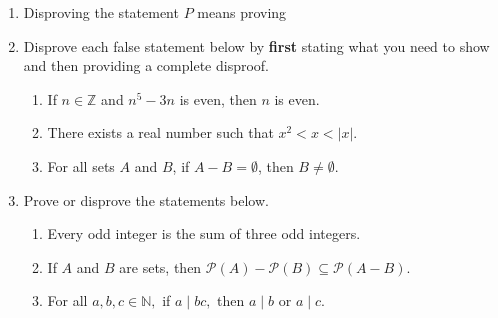 \documentclass[12pt]{article}
\newcommand{\N}{\mathbb{N}}
\newcommand{\Z}{\mathbb{Z}}
\begin{document}
\begin{enumerate}
\item Disproving the statement $P$ means proving \\

\item Disprove each false statement below by \textbf{first} stating what you need to show and then providing a complete disproof.
	\begin{enumerate}
	\item If $n \in \Z$ and $n^5-3n$ is even, then $n$ is even.
	\vfill
	\item There exists a real number such that $x^2 < x < |x|.$
	\vfill
	\item For all sets $A$ and $B$, if $A-B=\emptyset$, then $B \not = \emptyset.$
	\vfill
	\end{enumerate}
\newpage
\item Prove or disprove the statements below.
	\begin{enumerate}
	\item Every odd integer is the sum of three odd integers.
	\vfill
	\item If $A$ and $B$ are sets, then $\mathcal{P}(A) - \mathcal{P}(B)  \subseteq \mathcal{P}(A-B).$
	\vfill
	\item For all $a,b,c \in \N,$ if $a \mid bc,$ then $a \mid b$ or $a \mid c.$
	\vfill
	\end{enumerate}
\end{enumerate}
\end{document}
